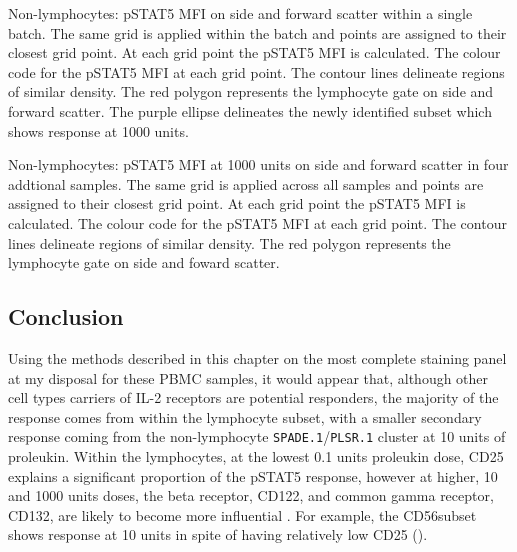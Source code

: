 { Non-lymphocytes: pSTAT5 MFI on side and forward scatter within a single batch. } 
{
    The same grid is applied within the batch and points are assigned to their closest grid point.
    At each grid point the pSTAT5 MFI is calculated.
    The colour code for the pSTAT5 MFI at each grid point.
    The contour lines delineate regions of similar density.
    The red polygon represents the lymphocyte gate on side and forward scatter.
    The purple ellipse delineates the newly identified subset which shows response at 1000 units.
}

{ Non-lymphocytes: pSTAT5 MFI at 1000 units on side and forward scatter in four addtional samples. } 
{
    The same grid is applied across all samples and points are assigned to their closest grid point.
    At each grid point the pSTAT5 MFI is calculated.
    The colour code for the pSTAT5 MFI at each grid point.
    The contour lines delineate regions of similar density.
    The red polygon represents the lymphocyte gate on side and foward scatter.
}


\subsection{Conclusion}

Using the methods described in this chapter on the most complete staining panel at my disposal for these \gls{PBMC} samples, it would appear that, although other cell types carriers of IL-2 receptors are potential responders, the majority of the response comes from within the lymphocyte subset, with a smaller secondary response coming from the non-lymphocyte \texttt{SPADE.1}/\texttt{PLSR.1} cluster at 10 units of proleukin.
Within the lymphocytes, at the lowest 0.1 units proleukin dose, CD25 explains a significant proportion of the pSTAT5 response, however at higher, 10 and 1000 units doses, the beta receptor, CD122, and common gamma receptor, CD132, are likely to become more influential \citep{Pekalski:2013ga}.
For example, the CD56\high subset
shows response at 10 units in spite of having relatively low CD25 ().

